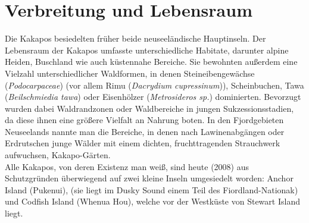 \documentclass{scrartcl}
\begin{document}
\section*{Verbreitung und Lebensraum}
\begin{multicols}{2}
Die Kakapos besiedelten früher beide neuseeländische Hauptinseln. Der Lebensraum der Kakapos umfasste unterschiedliche Habitate, darunter alpine Heiden, Buschland wie auch küstennahe Bereiche. Sie bewohnten außerdem eine Vielzahl unterschiedlicher Waldformen, in denen Steineibengewächse ({\itshape Podocarpaceae}) (vor allem Rimu ({\itshape Dacrydium cupressinum})), Scheinbuchen, Tawa ({\itshape Beilschmiedia tawa}) oder Eisenhölzer ({\itshape Metrosideros sp.}) dominierten. Bevorzugt wurden dabei Waldrandzonen oder Waldbereiche in jungen Sukzessionsstadien, da diese ihnen eine größere Vielfalt an Nahrung boten. In den Fjordgebieten Neuseelands nannte man die Bereiche, in denen nach Lawinenabgängen oder Erdrutschen junge Wälder mit einem dichten, fruchttragenden Strauchwerk aufwuchsen, Kakapo-Gärten.\\ 
Alle Kakapos, von deren Existenz man weiß, sind heute (2008) aus Schutzgründen überwiegend auf zwei kleine Inseln umgesiedelt worden: Anchor Island (Pukenui), (sie liegt im Dusky Sound einem Teil des Fiordland-Nationak) und Codfish Island (Whenua Hou), welche vor der Westküste von Stewart Island liegt.
\end{multicols}
\end{document}

